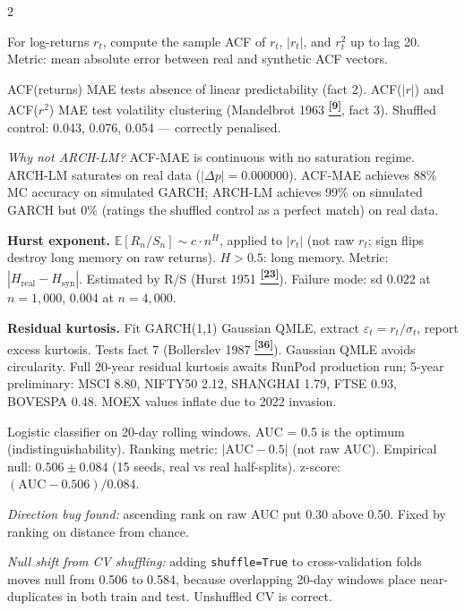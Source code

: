 \documentclass[10pt]{article}
\newcommand{\navybox}[2]{\begin{tcolorbox}[mybox={Navy}{LBg},title={#1}]#2\end{tcolorbox}}
\newcommand{\tealbox}[2]{\begin{tcolorbox}[mybox={Teal}{LBg},title={#1}]#2\end{tcolorbox}}
\newcommand{\purplebox}[2]{\begin{tcolorbox}[mybox={Purple}{LBg},title={#1}]#2\end{tcolorbox}}
\newcommand{\tcite}[1]{%
  \hyperlink{R:#1}{\textsuperscript{\scriptsize\textbf{[#1]}}}}
\newcommand{\E}{\mathbb{E}}
\begin{document}
\begin{multicols}{2}
\columnbreak

\purplebox{Temporal Group: ACF-MAE Triple}{%
For log-returns $r_t$, compute the sample ACF of $r_t$, $|r_t|$, and $r_t^2$ up to lag 20. Metric: mean absolute error between real and synthetic ACF vectors.

ACF(returns) MAE tests absence of linear predictability (fact 2). ACF($|r|$) and ACF($r^2$) MAE test volatility clustering (Mandelbrot 1963\tcite{9}, fact 3). Shuffled control: 0.043, 0.076, 0.054 --- correctly penalised.

\textit{Why not ARCH-LM?} ACF-MAE is continuous with no saturation regime. ARCH-LM saturates on real data ($|\Delta p| = 0.000000$). ACF-MAE achieves 88\% MC accuracy on simulated GARCH; ARCH-LM achieves 99\% on simulated GARCH but 0\% (ratings the shuffled control as a perfect match) on real data.}

\navybox{Temporal Group: Hurst and Residual Kurtosis}{%
\textbf{Hurst exponent.} $\E[R_n/S_n] \sim c\cdot n^H$, applied to $|r_t|$ (not raw $r_t$; sign flips destroy long memory on raw returns). $H>0.5$: long memory. Metric: $|H_\text{real} - H_\text{syn}|$. Estimated by R/S (Hurst 1951\tcite{23}). Failure mode: sd 0.022 at $n=1{,}000$, 0.004 at $n=4{,}000$.

\textbf{Residual kurtosis.} Fit GARCH(1,1) Gaussian QMLE, extract $\varepsilon_t = r_t/\sigma_t$, report excess kurtosis. Tests fact 7 (Bollerslev 1987\tcite{36}). Gaussian QMLE avoids circularity. Full 20-year residual kurtosis awaits RunPod production run; 5-year preliminary: MSCI 8.80, NIFTY50 2.12, SHANGHAI 1.79, FTSE 0.93, BOVESPA 0.48. MOEX values inflate due to 2022 invasion.}

\tealbox{Temporal Group: Discriminative AUC}{%
Logistic classifier on 20-day rolling windows. AUC = 0.5 is the optimum (indistinguishability). Ranking metric: $|\text{AUC} - 0.5|$ (not raw AUC). Empirical null: $0.506 \pm 0.084$ (15 seeds, real vs real half-splits). z-score: $(\text{AUC} - 0.506)/0.084$.

\textit{Direction bug found:} ascending rank on raw AUC put 0.30 above 0.50. Fixed by ranking on distance from chance.

\textit{Null shift from CV shuffling:} adding \texttt{shuffle=True} to cross-validation folds moves null from 0.506 to 0.584, because overlapping 20-day windows place near-duplicates in both train and test. Unshuffled CV is correct.}

\end{multicols}
\end{document}
